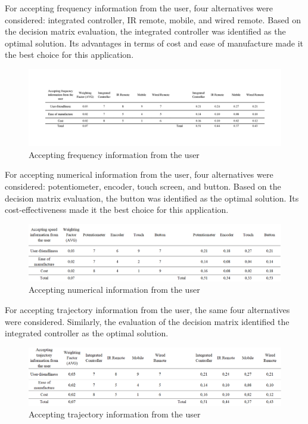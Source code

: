 \documentclass[12pt]{report}
\begin{document}
For accepting frequency information from the user, four alternatives were considered: integrated controller, IR remote, mobile, and wired remote. Based on the decision matrix evaluation, the integrated controller was identified as the optimal solution. Its advantages in terms of cost and ease of manufacture made it the best choice for this application.

\begin{figure}[H]
    \centering
    \includegraphics[width=1\textwidth]{Decision matrices/accept frequency.png}
    \caption{Accepting frequency information from the user}
\end{figure}

For accepting numerical information from the user, four alternatives were considered: potentiometer, encoder, touch screen, and button. Based on the decision matrix evaluation, the button was identified as the optimal solution. Its cost-effectiveness made it the best choice for this application.

\begin{figure}[H]
    \centering
    \includegraphics[width=1\textwidth]{Decision matrices/accept numerical.png}
    \caption{Accepting numerical information from the user}
\end{figure}

For accepting trajectory information from the user, the same four alternatives were considered. Similarly, the evaluation of the decision matrix identified the integrated controller as the optimal solution.

\begin{figure}[H]
    \centering
    \includegraphics[width=1\textwidth]{Decision matrices/accept traj.png}
    \caption{Accepting trajectory information from the user}
\end{figure}
\end{document}
